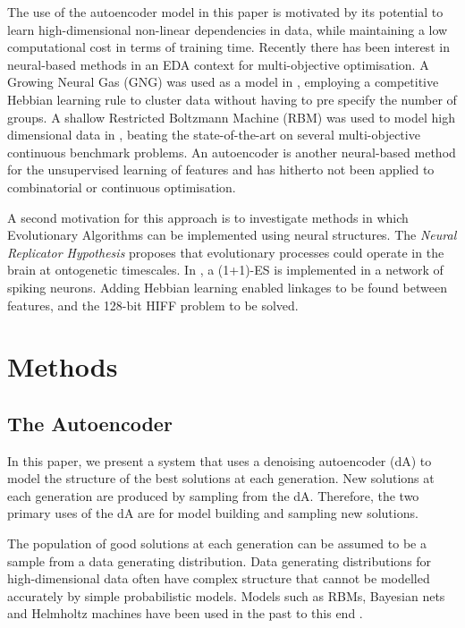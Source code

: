 \documentclass[runningheads,a4paper]{llncs}
\begin{document}
The use of the autoencoder model in this paper is motivated by its potential to learn high-dimensional non-linear dependencies in data, while maintaining a low computational cost in terms of training time. Recently there has been interest in neural-based methods in an EDA context for multi-objective optimisation. A Growing Neural Gas (GNG) was used as a model in \cite{moneda}, employing a competitive Hebbian learning rule to cluster data without having to pre specify the number of groups. A shallow Restricted Boltzmann Machine (RBM) was used to model high dimensional data in \cite{singapore}, beating the state-of-the-art on several multi-objective continuous benchmark problems. An autoencoder is another neural-based method for the unsupervised learning of features and has hitherto not been applied to combinatorial or continuous optimisation.

A second motivation for this approach is to investigate methods in which Evolutionary Algorithms can be implemented using neural structures. The {\em{Neural Replicator Hypothesis}} \cite{ref} proposes that evolutionary processes could operate in the brain at ontogenetic timescales. In \cite{fernando2010neuronal}, a (1+1)-ES is implemented in a network of spiking neurons. Adding Hebbian learning enabled linkages to be found between features, and the 128-bit HIFF problem to be solved.

\section{Methods}

\subsection{The Autoencoder}

In this paper, we present a system that uses a denoising autoencoder (dA) to model the structure of the best solutions at each generation. New solutions at each generation are produced by sampling from the dA. Therefore, the two primary uses of the dA are for model building and sampling new solutions.

The population of good solutions at each generation can be assumed to be a sample from a data generating distribution. Data generating distributions for high-dimensional data often have complex structure that cannot be modelled accurately by simple probabilistic models. Models such as RBMs, Bayesian nets and Helmholtz machines have been used in the past to this end \cite{zhang2000bayesian,tang2010restricted,pelikan2001escaping}.
\end{document}
